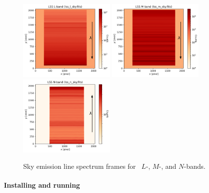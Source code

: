 \begin{figure}[!ht]
\centering
  \includegraphics[height=4cm,keepaspectratio]{figures/LSS_CrtAlg_files/lss_l_sky.fits.png}
  \includegraphics[height=4cm,keepaspectratio]{figures/LSS_CrtAlg_files/lss_m_sky.fits.png}
  \includegraphics[height=4cm,keepaspectratio]{figures/LSS_CrtAlg_files/lss_n_sky.fits.png}
  \caption[LSS plain sky observations]{Sky emission line spectrum frames for \lss~$L$-, $M$-, and $N$-bands.} 
  \label{fig:sky}
\end{figure}



\paragraph{Installing and running \pyred}\label{sec:pryred_install}

